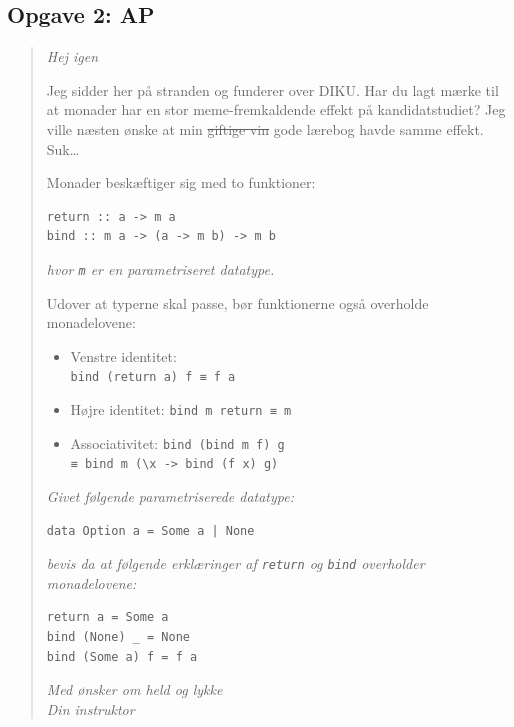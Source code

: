 \subsection{Opgave 2: AP}

\begin{quote}

{\em Hej igen

Jeg sidder her på stranden og funderer over DIKU.  Har du lagt mærke til at
monader har en stor meme-fremkaldende effekt på kandidatstudiet?  Jeg ville
næsten ønske at min \sout{giftige vin} \hspace{1mm} gode lærebog havde samme
effekt.  Suk\ldots

Monader beskæftiger sig med to funktioner:}

\vspace{-4mm}
\begin{verbatim}
return :: a -> m a
bind :: m a -> (a -> m b) -> m b
\end{verbatim}
\vspace{-3mm}
{\em hvor \texttt{m} er en parametriseret datatype.

Udover at typerne skal passe, bør funktionerne også overholde monadelovene:}

\begin{itemize}
\item Venstre identitet:\\\texttt{bind (return a) f ≡ f a}
\item Højre identitet: \texttt{bind m return ≡ m}
\item Associativitet: \texttt{bind (bind m f) g\\≡ bind m (\textbackslash x -> bind (f x) g)}
\end{itemize}

{\em Givet følgende parametriserede datatype:}
\vspace{-4mm}
\begin{verbatim}
data Option a = Some a | None
\end{verbatim}
\vspace{-2mm}
{\em bevis da at følgende erklæringer af \texttt{return} og \texttt{bind} overholder
monadelovene:}
\vspace{-4mm}
\begin{verbatim}
return a = Some a
bind (None) _ = None
bind (Some a) f = f a
\end{verbatim}
\vspace{2mm}
{\em Med ønsker om held og lykke\\
Din instruktor}

\end{quote}


